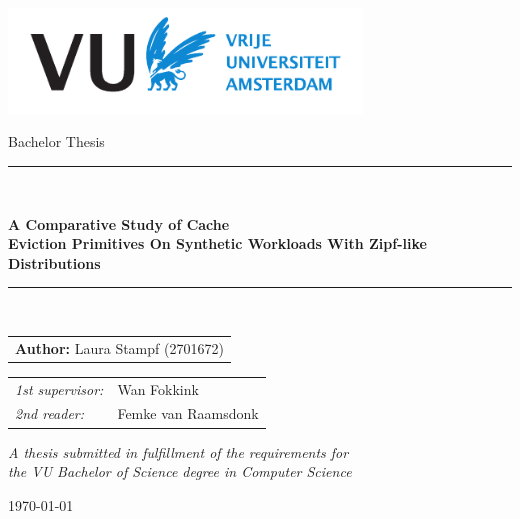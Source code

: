 \documentclass[a4paper, 10pt]{report}
\renewcommand{\chaptername}{} %
\begin{document}
\thispagestyle{empty}

\begin{center}
\vspace{1mm}
\includegraphics[height=28mm]{resources/logo-vua.pdf}
\vspace{1cm}

{\Large Bachelor Thesis}
\vspace{1cm}

\rule{.9\linewidth}{.6pt}\\
\vspace{0.4cm}
{\huge \bfseries A Comparative Study of Cache \\ Eviction Primitives On Synthetic Workloads With Zipf-like \\ Distributions \par}
\vspace{0.4cm}
\rule{.9\linewidth}{.6pt}\\[1.5cm]
\vspace*{2mm}
{\Large

\begin{tabular}{l}
{\bf Author:} Laura Stampf (2701672)
\end{tabular}
}

\vspace*{1.5cm}

\begin{tabular}{ll}
{\it 1st supervisor:} & Wan Fokkink \\
{\it 2nd reader:} & Femke van Raamsdonk  \\
\end{tabular}

\vspace*{2cm}
\textit{A thesis submitted in fulfillment of the requirements for\\ the VU Bachelor
of Science degree in Computer Science }
\vspace*{1cm}

\today %
\end{center}

\pagestyle{fancy}
\fancyhead{} %
\fancyhead[R]{ \leftmark}

\newpage
\tableofcontents









\printbibliography
\end{document}
